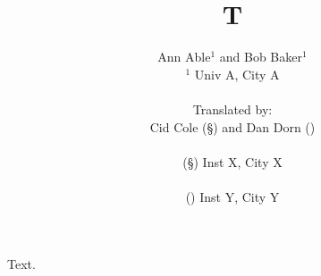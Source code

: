 \documentclass{article}
\begin{document}
\title{T}
\author{Ann Able$^{1}$ and Bob Baker$^{1}$\\
$^1$ Univ A, City A\\
\\
Translated by:\\
Cid Cole (\S) and Dan Dorn (\dag)\\
\\
(\S) Inst X, City X\\
\\
(\dag) Inst Y, City Y}
\maketitle
Text.
\end{document}
